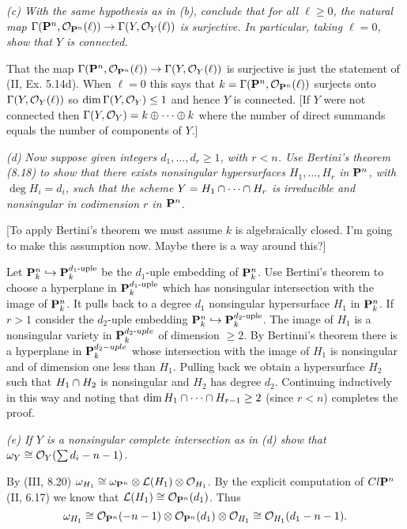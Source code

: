 \documentclass[12pt]{article}
\begin{document}
{\em (c) With the same hypothesis as in (b), conclude that for all
$\ell\geq 0$, the natural map $\Gamma(\P^n,\sO_{\P^n}(\ell))\into\Gamma(Y,\sO_Y(\ell))$
is surjective. In particular, taking $\ell=0$, show that $Y$ is connected.}

That the map $\Gamma(\P^n,\sO_{\P^n}(\ell))\into\Gamma(Y,\sO_Y(\ell))$
is surjective is just the statement of (II, Ex. 5.14d). When $\ell=0$
this says that 
$k=\Gamma(\P^n,\sO_{\P^n}(\ell))$ surjects onto $\Gamma(Y,\sO_Y(\ell))$
so $\dim\Gamma(Y,\sO_Y)\leq 1$ and hence $Y$ is connected. [If $Y$ were
not connected then $\Gamma(Y,\sO_Y)=k\oplus\cdots\oplus k$ where the
number of direct summands equals the number of components of $Y$.]

{\em (d) Now suppose given integers $d_1,\ldots,d_r\geq 1$, with
$r<n$. Use Bertini's theorem (8.18) to show that there exists nonsingular
hypersurfaces $H_1,\ldots,H_r$ in $\P^n$, with $\deg H_i=d_i$, such that
the scheme $Y=H_1\intersect\cdots\intersect H_r$ is irreducible
and nonsingular in codimension $r$ in $\P^n$.}

[To apply Bertini's theorem we must assume $k$ is algebraically closed.
I'm going to make this assumption now. Maybe there is a way around this?] 

Let $\P_k^n\hookrightarrow\P_k^{d_1\text{-uple}}$ 
be the $d_1$-uple embedding of $\P_k^n$.  Use Bertini's theorem to choose
a hyperplane in
$\P_k^{d_1\text{-uple}}$ which has nonsingular intersection with
the image of $\P_k^n$. It pulls back to a degree $d_1$ nonsingular
hypersurface $H_1$ in $\P_k^n$. If $r>1$ consider the $d_2$-uple embedding
$\P_k^n\hookrightarrow\P_k^{d_2\text{-uple}}$. 
The image of $H_1$ is a nonsingular variety in $\P_k^{d_2{\text-uple}}$
of dimension $\geq 2$. By Bertinni's theorem there is a hyperplane
in $\P_k^{d_2-uple}$ whose intersection with the image of $H_1$ is nonsingular
and of dimension one less than $H_1$. Pulling back we obtain a hypersurface
$H_2$ such that $H_1\intersect H_2$ is nonsingular and $H_2$ has degree
$d_2$. Continuing inductively in this way and noting that
$\dim H_1\intersect\cdots\intersect H_{r-1}\geq 2$ (since 
$r<n$) completes the proof. 

{\em (e) If $Y$ is a nonsingular complete intersection as in (d) 
show that $\omega_Y\isom\sO_Y(\sum d_i-n-1)$.}

By (III, 8.20) $\omega_{H_1}\isom\omega_{\P^n}\tensor\sL(H_1)\tensor\sO_{H_1}$.
By the explicit computation of $Cl\P^n$ (II, 6.17) we know that
$\sL(H_1)\isom\sO_{\P^n}(d_1)$. Thus 
$$\omega_{H_1}\isom\sO_{\P^n}(-n-1)\tensor\sO_{\P^n}(d_1)\tensor\sO_{H_1}\isom\sO_{H_1}(d_1-n-1).$$ 
\end{document}
